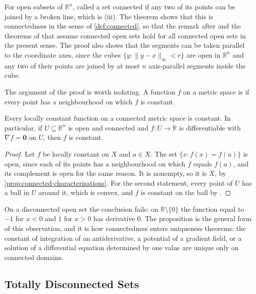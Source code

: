 For open subsets of $\mathbb R^n$,  called a set connected if any two of its points can be joined by a broken line, which is (iii). The theorem shows that this is connectedness in the sense of \cref{def:connected}, so that the remark after  and the theorems of  that assume connected open sets hold for all connected open sets in the present sense. The proof also shows that the segments can be taken parallel to the coordinate axes, since the cubes $\{y: \|y-x\|_\infty<r\}$ are open in $\mathbb R^n$ and any two of their points are joined by at most $n$ axis-parallel segments inside the cube.

The argument of the proof is worth isolating. A function $f$ on a metric space is  if every point has a neighbourhood on which $f$ is constant.

\begin{proposition}
\label{prop:locally-constant}
Every locally constant function on a connected metric space is constant. In particular, if $U\subseteq\mathbb R^n$ is open and connected and $f\colon U\to\mathbb R$ is differentiable with $\nabla f=\mathbf 0$ on $U$, then $f$ is constant.
\end{proposition}

\begin{proof}
Let $f$ be locally constant on $X$ and $a\in X$. The set $\{x: f(x)=f(a)\}$ is open, since each of its points has a neighbourhood on which $f$ equals $f(a)$, and its complement is open for the same reason. It is nonempty, so it is $X$, by \cref{prop:connected-characterisations}. For the second statement, every point of $U$ has a ball in $U$ around it, which is convex, and $f$ is constant on the ball by .
\end{proof}

On a disconnected open set the conclusion fails: on $\mathbb R\setminus\{0\}$ the function equal to $-1$ for $x<0$ and $1$ for $x>0$ has derivative $0$. The proposition is the general form of this observation, and it is how connectedness enters uniqueness theorems: the constant of integration of an antiderivative, a potential of a gradient field, or a solution of a differential equation determined by one value are unique only on connected domains.

\subsection{Totally Disconnected Sets}

